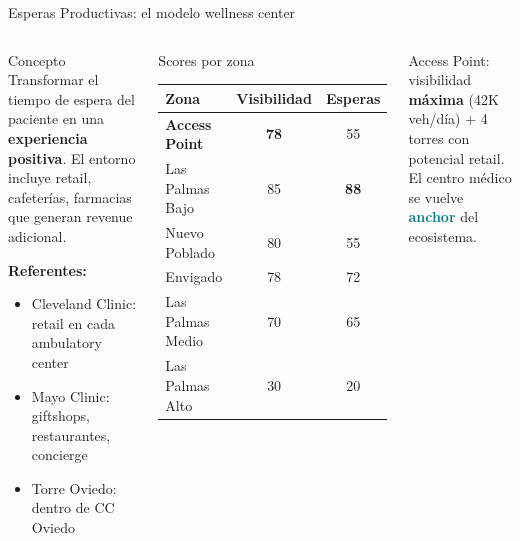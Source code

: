 \documentclass[aspectratio=169, 11pt]{beamer}
\newcommand{\highlight}[1]{\textcolor{teal}{\textbf{#1}}}
\begin{document}
\begin{frame}{Esperas Productivas: el modelo wellness center}
\begin{columns}[T]
\begin{block}{\small Concepto}
\footnotesize
Transformar el tiempo de espera del paciente en una \textbf{experiencia positiva}. El entorno incluye retail, cafeterías, farmacias que generan revenue adicional.

\vspace{4pt}
\textbf{Referentes:}
\begin{itemize}\setlength{\itemsep}{1pt}\scriptsize
  \item Cleveland Clinic: retail en cada ambulatory center
  \item Mayo Clinic: giftshops, restaurantes, concierge
  \item Torre Oviedo: dentro de CC Oviedo
\end{itemize}
\end{block}

\begin{block}{\small Scores por zona}
\scriptsize
\begin{tabular}{@{}lcc@{}}
\toprule
\textbf{Zona} & \textbf{Visibilidad} & \textbf{Esperas} \\
\midrule
\rowcolor{rose!10}
\textbf{Access Point} & \textcolor{rose}{\textbf{78}} & 55 \\
\rowcolor{teal!8}
Las Palmas Bajo & 85 & \textbf{88} \\
Nuevo Poblado & 80 & 55 \\
Envigado & 78 & 72 \\
Las Palmas Medio & 70 & 65 \\
\rowcolor{coral!8}
Las Palmas Alto & 30 & 20 \\
\bottomrule
\end{tabular}
\end{block}

\vspace{4pt}
\begin{exampleblock}{}
\centering\footnotesize
Access Point: visibilidad \textbf{máxima} (42K veh/día) + 4 torres con potencial retail. El centro médico se vuelve \highlight{anchor} del ecosistema.
\end{exampleblock}
\end{columns}
\end{frame}
\end{document}
